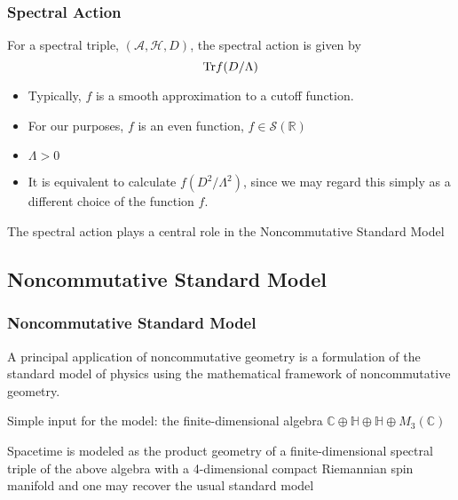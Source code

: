 \documentclass{beamer}
\def\C{{\mathbb C}}
\renewcommand{\H}{{\mathbb H}}
\def\R{{\mathbb R}}
\def\cA{{\mathcal A}}
\def\cH{{\mathcal H}}
\def\Tr{{\rm Tr}}
\begin{document}
\begin{frame}
  \frametitle{Spectral Action}

  \begin{block}{}
    For a spectral triple, $(\cA, \cH, D)$, the spectral action is given by
    \[
    \Tr f(D / \Lambda)
    \]
  \end{block}

  \pause

  \begin{itemize}
    \item Typically, $f$ is a smooth approximation to a cutoff function.
    \item For our purposes, $f$ is an even function, $f \in \mathcal{S} (\R)$
    \item $\Lambda > 0$
    \item It is equivalent to calculate $f(D^2/ \Lambda ^2)$, since we may regard this simply as a different choice of the function $f$.
  \end{itemize}

  \pause

  \begin{block}{}
    The spectral action plays a central role in the Noncommutative Standard Model
  \end{block}

\end{frame}


\subsection{Noncommutative Standard Model}

\begin{frame}
  \frametitle{Noncommutative Standard Model}

  \begin{block}{}
    A principal application of noncommutative geometry is a formulation of the standard model of physics using the mathematical framework of noncommutative geometry.
  \end{block}

  \pause

  \begin{block}{}
    Simple input for the model: the finite-dimensional algebra $\C \oplus \H \oplus \H \oplus M_3(\C)$
  \end{block}

  \pause

  \begin{block}{}
    Spacetime is modeled as the product geometry of a finite-dimensional spectral triple of the above algebra with a 4-dimensional compact Riemannian spin manifold and one may recover the usual standard model
  \end{block}

\end{frame}
\end{document}
